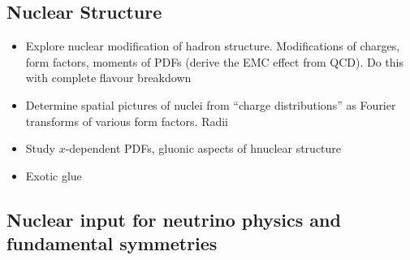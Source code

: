 \subsection{Nuclear Structure}
\label{sec:nuclearstructure}
\begin{itemize}
	\item Explore nuclear modification of hadron structure. Modifications of charges, form factors, moments of PDFs  (derive the EMC effect from QCD). 
	Do this with complete flavour breakdown
	\item Determine spatial pictures of nuclei from ``charge distributions'' as Fourier transforms of various form factors. Radii
	\item Study $x$-dependent PDFs, gluonic aspects of hnuclear structure
	\item Exotic glue
\end{itemize}



\subsection{Nuclear input for neutrino physics and fundamental symmetries}


